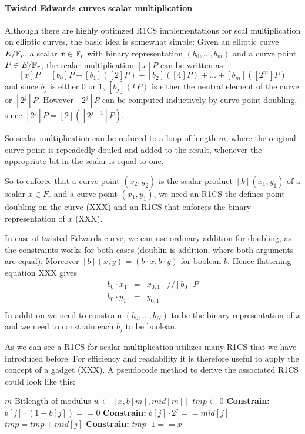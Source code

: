 \paragraph{Twisted Edwards curves scalar multiplication} 

Although there are highly optimzed R1CS implementations for scal multiplication on elliptic curves, the basic idea is somewhat simple: Given an elliptic curve $E/\mathbb{F}_r$, a scalar $x\in \mathbb{F}_r$ with binary representation $(b_0,\ldots,b_m)$ and a curve point $P\in E/\mathbb{F}_r$, the scalar multiplication $[x]P$ can be written as
$$
[x]P = [b_0]P + [b_1]([2]P) + [b_2]([4]P) + \ldots + [b_m]([2^m] P)
$$
and since $b_j$ is either $0$ or $1$, $[b_j](kP)$ is either the neutral element of the curve or $[2^j]P$. However $[2^j]P$ can be computed inductively by curve point doubling, since $[2^j]P= [2]([2^{j-1}]P)$.

So scalar multiplication can be reduced to a loop of length $m$, where the original curve point is repeadedly douled and added to the result, whenever the appropriate bit in the scalar is equal to one.

So to enforce that a curve point $(x_2,y_2)$ is the scalar product $[k](x_1,y_1)$ of a scalar $x\in F_r$ and a curve point $(x_1,y_1)$, we need an R1CS the defines point doubling on the curve (XXX) and an R1CS that enforces the binary representation of $x$ (XXX). 

In case of twisted Edwards curve, we can use ordinary addition for doubling, as the constraints works for both cases (doublin is addition, where both arguments are equal). Moreover $[b](x,y)=(b\cdot x, b\cdot y)$ for boolean $b$. Hence flattening equation XXX gives
$$
\begin{array}{lclr}
b_0\cdot x_1 &=& x_{0,1} & // [b_0]P\\
b_0\cdot y_1 &=& y_{0,1}\\

\end{array}
$$
In addition we need to constrain $(b_0,\ldots, b_N)$ to be the binary representation of $x$ and we need to constrain each $b_j$ to be boolean.

As we can see a R1CS for scalar multiplication utilizes many R1CS that we have introduced before. For efficiency and readability it is therefore useful to apply the concept of a gadget (XXX). A pseudocode method to derive the associated R1CS could look like this:
\begin{algorithmic}
\Require $m$ Bitlength of modulus
\Statement $w \gets [x,b[m],mid[m]]$
\State $tmp \gets 0$
	\State \textbf{Constrain:} $b[j]\cdot (1-b[j]) == 0$
	\State \textbf{Constrain:} $b[j] \cdot 2^j == mid[j]$
	\State $tmp = tmp + mid[j]$
\EndFor
\State \textbf{Constrain:} $tmp \cdot 1 == x$
\end{algorithmic}


